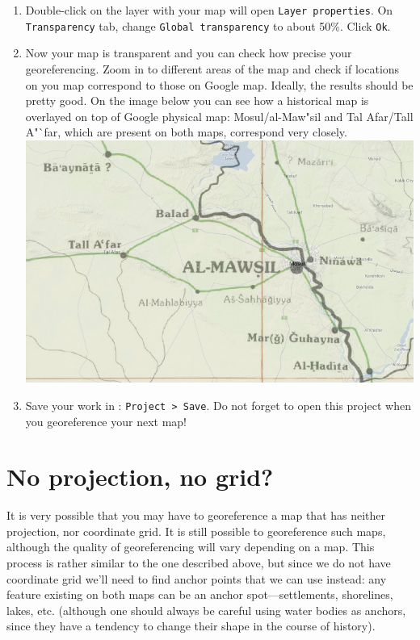 \documentclass[12pt,oneside]{article}
\begin{document}
\begin{enumerate}
\item Double-click on the layer with your map will open \texttt{Layer properties}. On \texttt{Transparency} tab, change \texttt{Global transparency} to about 50\%. Click \texttt{Ok}.

\item Now your map is transparent and you can check how precise your georeferencing. Zoom in to different areas of the map and check if locations on you map correspond to those on Google map. Ideally, the results should be pretty good. On the image below you can see how a historical map is overlayed on top of Google physical map: Mosul/al-Maw"sil and Tal Afar/Tall A"`far, which are present on both maps, correspond very closely.\\
\includegraphics[scale=.5]{qgis_georeferencedmap}

\item Save your work in \QGIS: \texttt{Project > Save}. Do not forget to open this project when you georeference your next map!


\end{enumerate}

\section{No projection, no grid?}

It is very possible that you may have to georeference a map that has neither projection, nor coordinate grid. It is still possible to georeference such maps, although the quality of georeferencing will vary depending on a map. This process is rather similar to the one described above, but since we do not have coordinate grid we'll need to find anchor points that we can use instead: any feature existing on both maps can be an anchor spot---settlements, shorelines, lakes, etc. (although one should always be careful using water bodies as anchors, since they have a tendency to change their shape in the course of history).
\end{document}
